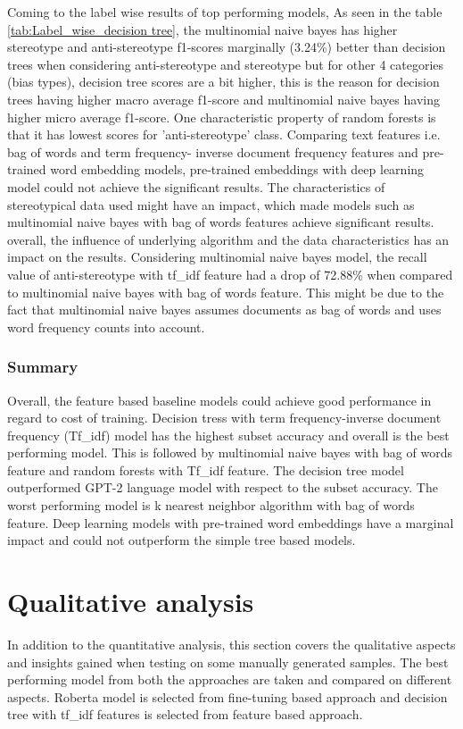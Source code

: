 Coming to the label wise results of top performing models, As seen in the table \ref{tab:Label_wise_decision tree}, the multinomial naive bayes has higher stereotype and anti-stereotype f1-scores marginally (3.24\%) better than decision trees when considering anti-stereotype and stereotype but for other 4 categories (bias types), decision tree scores are a bit higher, this is the reason for decision trees having higher macro average f1-score and multinomial naive bayes having higher micro average f1-score. One characteristic property of random forests is that it has lowest scores for 'anti-stereotype' class. Comparing text features i.e. bag of words and term frequency- inverse document frequency features and pre-trained word embedding models, pre-trained embeddings with deep learning model could not achieve the significant results. The characteristics of stereotypical data used might have an impact, which made models such as multinomial naive bayes with bag of words features achieve significant results. overall, the influence of underlying algorithm and the data characteristics has an impact on the results. Considering multinomial naive bayes model, the recall value of anti-stereotype with tf\_idf feature had a drop of 72.88\% when compared to multinomial naive bayes with bag of words feature. This might be due to the fact that multinomial naive bayes assumes documents as bag of words and uses word frequency counts into account.

\subsubsection{Summary}
Overall, the feature based baseline models could achieve good performance in regard to cost of training. Decision tress with term frequency-inverse document frequency (Tf\_idf) model has the highest subset accuracy and overall is the best performing model. This is followed by multinomial naive bayes with bag of words feature and random forests with Tf\_idf feature. The decision tree model outperformed GPT-2 language model with respect to the subset accuracy. The worst performing model is k nearest neighbor algorithm with bag of words feature. Deep learning models with pre-trained word embeddings have a marginal impact and could not outperform the simple tree based models. 

\pagebreak

\section{Qualitative analysis} \label{Qualitative_analysis}
In addition to the quantitative analysis, this section covers the qualitative aspects and insights gained when testing on some manually generated samples. The best performing model from both the approaches are taken and compared on different aspects. Roberta model is selected from fine-tuning based approach and decision tree with tf\_idf features is selected from feature based approach.

